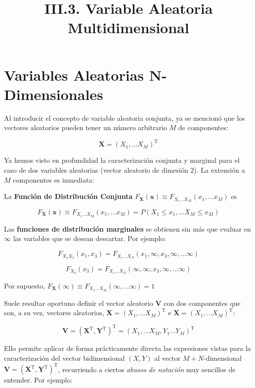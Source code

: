\documentclass[11pt]{article}
\title{III.3. Variable Aleatoria Multidimensional}
\begin{document}
    
    
    \maketitle
    
    

    
    \hypertarget{variables-aleatorias-n-dimensionales}{%
\section{Variables Aleatorias
N-Dimensionales}\label{variables-aleatorias-n-dimensionales}}

Al introducir el concepto de variable aleatoria conjunta, ya se mencionó
que los vectores aleatorios pueden tener un número arbitrario \(M\) de
componentes:

\[\mathbf X = (X_1, \ldots X_M)^\mathrm{T}\]

Ya hemos visto en profundidad la caracterización conjunta y marginal
para el caso de dos variables aleatorias (vector aleatorio de dimesión
\(2\)). La extensión a \(M\) componentes es inmediata:

La \textbf{Función de Distribución Conjunta}
\(F_\mathbf{X}(\mathbf{x}) \equiv F_{X_1\ldots X_M}(x_1,\ldots x_M)\) es

\[
F_\mathbf{X}(\mathbf{x}) \equiv F_{X_1\ldots X_M}(x_1,\ldots x_M) = 
P(X_1 \leq x_1, \ldots X_M \leq x_M)
\]

Las \textbf{funciones de distribución marginales} se obtienen sin más
que evaluar en \(\infty\) las variables que se desean descartar. Por
ejemplo:

\[
F_{X_1X_3}(x_1, x_3) = F_{X_1\ldots X_N}(x_1,\infty, x_3, \infty , \ldots \infty)
\]

\[
F_{X_3}(x_3) = F_{X_1 \ldots X_N}(\infty,\infty, x_3, \infty , \ldots \infty)
\]

Por supuesto,
\(F_\mathbf{X}(\boldsymbol{\infty}) \equiv F_{X_1\ldots X_M}(\infty,\ldots \infty) = 1\)

    Suele resultar oportuno definir el vector aleatorio \(\mathbf{V}\) con
dos componentes que son, a su vez, vectores aleatorios,
\(\mathbf X = (X_1, \ldots X_M)^\mathrm{T}\) e
\(\mathbf X = (X_1, \ldots X_M)^\mathrm{T}\):

\[\mathbf V = (\mathbf{X}^\mathrm{T} , \mathbf{Y}^\mathrm{T})^\mathrm{T} = 
(X_1, \ldots X_M , Y_1 \ldots Y_M)^\mathrm{T}\]

Ello permite aplicar de forma prácticamente directa las expresiones
vistas para la caracterización del vector bidimensional \((X,Y)\) al
vector \(M+N\)-dimensional
\(\mathbf V = (\mathbf{X}^\mathrm{T} , \mathbf{Y}^\mathrm{T})^\mathrm{T}\),
recurriendo a ciertos \emph{abusos de notación} muy sencillos de
entender. Por ejemplo:
\end{document}

